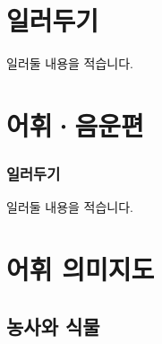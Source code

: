 \documentclass{snu-fl-questionnaire}
\begin{document}




\chapter{일러두기}
일러둘 내용을 적습니다.


\mainmatter
\chapter{어휘·음운편}
\subsection{일러두기}
일러둘 내용을 적습니다.




















\chapter{어휘 의미지도}
\section{농사와 식물}
\end{document}
